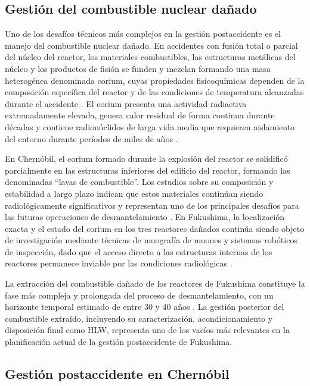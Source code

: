 \subsection{Gestión del combustible nuclear dañado}

Uno de los desafíos técnicos más complejos en la gestión postaccidente es el
manejo del combustible nuclear dañado. En accidentes con fusión total o parcial
del núcleo del reactor, los materiales combustibles, las estructuras metálicas
del núcleo y los productos de fisión se funden y mezclan formando una masa
heterogénea denominada corium, cuyas propiedades fisicoquímicas dependen de la
composición específica del reactor y de las condiciones de temperatura alcanzadas
durante el accidente \cite{Journeau2012}. El corium presenta una actividad
radiactiva extremadamente elevada, genera calor residual de forma continua durante
décadas y contiene radionúclidos de larga vida media que requieren aislamiento del
entorno durante períodos de miles de años \cite{Journeau2012}.

En Chernóbil, el corium formado durante la explosión del reactor se solidificó
parcialmente en las estructuras inferiores del edificio del reactor, formando
las denominadas ``lavas de combustible''. Los estudios sobre su composición y
estabilidad a largo plazo indican que estos materiales continúan siendo
radiológicamente significativos y representan uno de los principales desafíos
para las futuras operaciones de desmantelamiento \cite{Borovoi1990}. En Fukushima,
la localización exacta y el estado del corium en los tres reactores dañados
continúa siendo objeto de investigación mediante técnicas de muografía de
muones y sistemas robóticos de inspección, dado que el acceso directo a las
estructuras internas de los reactores permanece inviable por las condiciones
radiológicas \cite{IAEA2015Fukushima}.

La extracción del combustible dañado de los reactores de Fukushima constituye
la fase más compleja y prolongada del proceso de desmantelamiento, con un horizonte
temporal estimado de entre 30 y 40 años \cite{IAEA2015Fukushima}. La gestión
posterior del combustible extraído, incluyendo su caracterización, acondicionamiento
y disposición final como HLW, representa uno de los vacíos más relevantes en la
planificación actual de la gestión postaccidente de Fukushima.

\subsection{Gestión postaccidente en Chernóbil}

